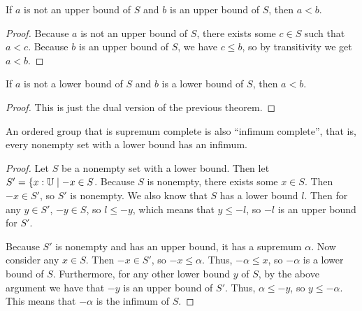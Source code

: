 \documentclass[../math.tex]{subfiles}
\begin{document}
\begin{theorem} \label{upper-bound-leq}
    If $a$ is not an upper bound of $S$ and $b$ is an upper bound of $S$, then
    $a < b$.
\end{theorem}
\begin{proof}
    Because $a$ is not an upper bound of $S$, there exists some $c \in S$ such
    that $a < c$.  Because $b$ is an upper bound of $S$, we have $c \leq b$, so
    by transitivity we get $a < b$.
\end{proof}

\begin{theorem} \label{lower-bound-leq}
    If $a$ is not a lower bound of $S$ and $b$ is a lower bound of $S$, then $a
    < b$.
\end{theorem}
\begin{proof}
    This is just the dual version of the previous theorem.
\end{proof}

\begin{theorem}
    An ordered group that is supremum complete is also ``infimum complete'',
    that is, every nonempty set with a lower bound has an infimum.
\end{theorem}
\begin{proof}
    Let $S$ be a nonempty set with a lower bound.  Then let $S' = \{x : \mathbb{U} \mid
    -x \in S$.  Because $S$ is nonempty, there exists some $x \in S$.  Then $-x
    \in S'$, so $S'$ is nonempty.  We also know that $S$ has a lower bound $l$.
    Then for any $y \in S'$, $-y \in S$, so $l \leq -y$, which means that $y
    \leq -l$, so $-l$ is an upper bound for $S'$.

    Because $S'$ is nonempty and has an upper bound, it has a supremum $\alpha$.
    Now consider any $x \in S$.  Then $-x \in S'$, so $-x \leq \alpha$.  Thus,
    $-\alpha \leq x$, so $-\alpha$ is a lower bound of $S$.  Furthermore, for
    any other lower bound $y$ of $S$, by the above argument we have that $-y$ is
    an upper bound of $S'$.  Thus, $\alpha \leq -y$, so $y \leq -\alpha$.  This
    means that $-\alpha$ is the infimum of $S$.
\end{proof}
\end{document}
